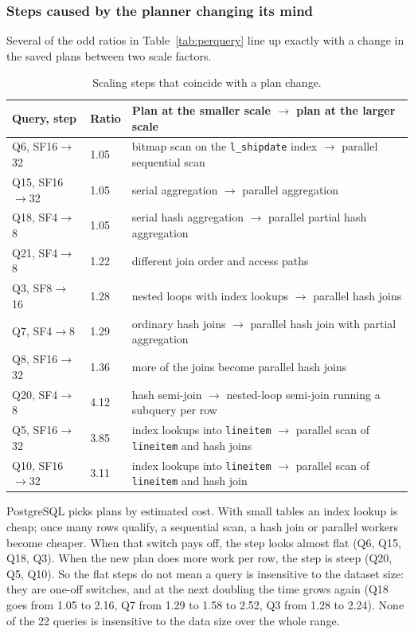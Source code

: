 \documentclass[11pt,a4paper]{article}
\newcommand{\file}[1]{\texttt{#1}}
\begin{document}
\subsubsection*{Steps caused by the planner changing its mind}

Several of the odd ratios in Table~\ref{tab:perquery} line up exactly with a
change in the saved plans between two scale factors.

\begin{table}[H]
\centering
\small
\begin{tabularx}{\textwidth}{@{}llX@{}}
\toprule
Query, step & Ratio & Plan at the smaller scale $\rightarrow$ plan at the larger scale \\
\midrule
Q6, SF16$\rightarrow$32  & 1.05 & bitmap scan on the \file{l\_shipdate} index $\rightarrow$ parallel sequential scan \\
Q15, SF16$\rightarrow$32 & 1.05 & serial aggregation $\rightarrow$ parallel aggregation \\
Q18, SF4$\rightarrow$8   & 1.05 & serial hash aggregation $\rightarrow$ parallel partial hash aggregation \\
Q21, SF4$\rightarrow$8   & 1.22 & different join order and access paths \\
Q3, SF8$\rightarrow$16   & 1.28 & nested loops with index lookups $\rightarrow$ parallel hash joins \\
Q7, SF4$\rightarrow$8    & 1.29 & ordinary hash joins $\rightarrow$ parallel hash join with partial aggregation \\
Q8, SF16$\rightarrow$32  & 1.36 & more of the joins become parallel hash joins \\
Q20, SF4$\rightarrow$8   & 4.12 & hash semi-join $\rightarrow$ nested-loop semi-join running a subquery per row \\
Q5, SF16$\rightarrow$32  & 3.85 & index lookups into \file{lineitem} $\rightarrow$ parallel scan of \file{lineitem} and hash joins \\
Q10, SF16$\rightarrow$32 & 3.11 & index lookups into \file{lineitem} $\rightarrow$ parallel scan of \file{lineitem} and hash join \\
\bottomrule
\end{tabularx}
\caption{Scaling steps that coincide with a plan change.}
\end{table}

PostgreSQL picks plans by estimated cost. With small tables an index lookup
is cheap; once many rows qualify, a sequential scan, a hash join or parallel
workers become cheaper. When that switch pays off, the step looks almost flat
(Q6, Q15, Q18, Q3). When the new plan does more work per row, the step is
steep (Q20, Q5, Q10). So the flat steps do not mean a query is insensitive to
the dataset size: they are one-off switches, and at the next doubling the time
grows again (Q18 goes from 1.05 to 2.16, Q7 from 1.29 to 1.58 to 2.52, Q3 from
1.28 to 2.24). None of the 22 queries is insensitive to the data size over the
whole range.
\end{document}
